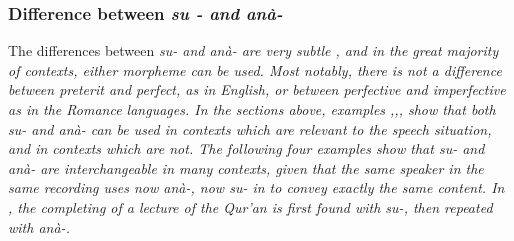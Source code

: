 %
%
%
%
%
%




% 
% 
% 



\subsubsection{Difference between \em su - \em and \em anà- \em}\label{sec:morph:Differencebetweensuandana}
The differences between \em su- \em and \em anà- \em are very subtle \citep[167]{SmithEtAl2007}, and in the great majority of contexts, either morpheme can be used. Most notably, there is not a difference between preterit and perfect, as in English, or between perfective and imperfective as in the Romance languages. In the sections above, examples ,,, show that both \em su- \em and \em anà- \em can be used in contexts which are relevant to the speech situation, and in contexts which are not. The following four examples show that \em su- \em and \em anà- \em are interchangeable in many contexts, given that the same speaker in the same recording uses now \em anà-\em, now \em su- \em in to convey exactly the same content. In , the completing of a lecture of the Qur'an is first found with \em su-\em, then repeated with \em anà-\em.


